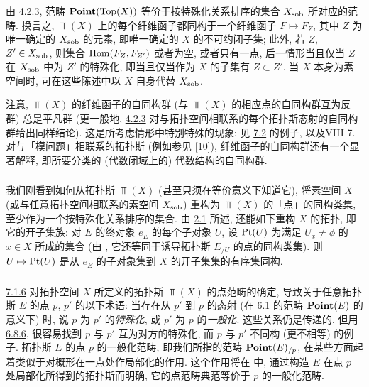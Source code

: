 \subsubsection{}
由 \hyperref[IV.subsubsec4.2.3]{4.2.3}, 范畴 $\operatorname{\mathbf{Point}}(\operatorname{Top}(X))$ 等价于按特殊化关系排序的集合 $X_{\operatorname{sob}}$ 所对应的范畴. 换言之, $\Top(X)$ 上的每个纤维函子都同构于一个纤维函子 $F\mapsto F_Z$, 其中 $Z$ 为唯一确定的 $X_{\operatorname{sob}}$ 的元素, 即唯一确定的 $X$ 的不可约闭子集; 此外, 若 $Z$, $Z'\in X_{\operatorname{sob}}$, 则集合 $\operatorname{Hom}(F_Z,F_{Z'})$ 或者为空, 或者只有一点, 后一情形当且仅当 $Z$ 在 $X_{\operatorname{sob}}$ 中为 $Z'$ 的特殊化, 即当且仅当作为 $X$ 的子集有 $Z\subset Z'$. 当 $X$ 本身为素空间时, 可在这些陈述中以 $X$ 自身代替 $X_{\operatorname{sob}}$.

注意, $\Top(X)$ 的纤维函子的自同构群 (与 $\Top(X)$ 的相应点的自同构群互为反群) 总是平凡群 (更一般地, \hyperref[IV.subsubsec4.2.3]{4.2.3} 对与拓扑空间相联系的每个拓扑斯态射的自同构群给出同样结论). 这是所考虑情形中特别特殊的现象: 见 \hyperref[IV.subsec7.2]{7.2} 的例子, 以及\pageoriginale VIII 7. 对与「模问题」相联系的拓扑斯 (例如参见 [10]), 纤维函子的自同构群还有一个显著解释, 即所要分类的 (代数闭域上的) 代数结构的自同构群.

\subsubsection{}
我们刚看到如何从拓扑斯 $\Top(X)$ (甚至只须在等价意义下知道它), 将素空间 $X$ (或与任意拓扑空间相联系的素空间 $X_{\operatorname{sob}}$) 重构为 $\Top(X)$ 的「点」的同构类集, 至少作为一个按特殊化关系排序的集合. 由 \hyperref[IV.subsec2.1]{2.1} 所述, 还能如下重构 $X$ 的拓扑, 即它的开子集族: 对 $E$ 的终对象 $e_E$ 的每个子对象 $U$, 设 $\operatorname{Pt}(U)$ 为满足 $U_x\neq\phi$ 的 $x\in X$ 所成的集合 (由 , 它还等同于诱导拓扑斯 $E_{/U}$ 的点的同构类集). 则 $U\mapsto \operatorname{Pt}(U)$ 是从 $e_E$ 的子对象集到 $X$ 的开子集集的有序集同构.

\subsubsection{}
\hyperref[IV.subsubsec7.1.6]{7.1.6} 对拓扑空间 $X$ 所定义的拓扑斯 $\Top(X)$ 的点范畴的确定, 导致关于任意拓扑斯 $E$ 的点 $p$, $p'$ 的以下术语: 当存在从 $p'$ 到 $p$ 的态射 (在 \hyperref[IV.def6.1]{6.1} 的范畴 $\operatorname{\mathbf{Point}}(E)$ 的意义下) 时, 说 $p$ 为 $p'$ 的\emph{特殊化}, 或 $p'$ 为 $p$ 的\emph{一般化}. 这些关系仍是传递的, 但用 \hyperref[IV.subsubsec6.8.6]{6.8.6}, 很容易找到 $p$ 与 $p'$ 互为对方的特殊化\pageoriginale, 而 $p$ 与 $p'$ 不同构 (更不相等) 的例子. 拓扑斯 $E$ 的点 $p$ 的一般化范畴, 即我们所指的范畴 $\operatorname{\mathbf{Point}}(E)_{/p}$, 在某些方面起着类似于对概形在一点处作局部化的作用. 这个作用将在  中, 通过构造 $E$ 在点 $p$ 处局部化所得到的拓扑斯而明确, 它的点范畴典范等价于 $p$ 的一般化范畴.

